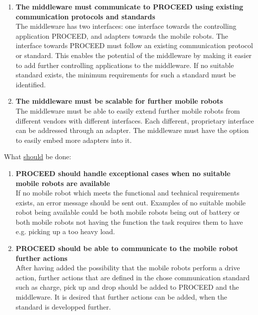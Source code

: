 \begin{enumerate}
   \item \textbf{The middleware must communicate to PROCEED using existing communication protocols and standards} \hfill \\ 
	The middleware has two interfaces: one interface towards the controlling application PROCEED, and adapters towards the mobile robots. The interface towards PROCEED must follow an existing communication protocol or standard. This enables the potential of the middleware by making it easier to add further controlling applications to the middleware. If no suitable standard exists, the minimum requirements for such a standard must be identified.
   \item \textbf{The middleware must be scalable for further mobile robots} \hfill \\ 
	The middleware must be able to easily extend further mobile robots from different vendors with different interfaces. Each different, proprietary interface can be addressed through an adapter. The middleware must have the option to easily embed more adapters into it.
\end{enumerate}

What \underline{should} be done:
\begin{enumerate}
   \item \textbf{PROCEED should handle exceptional cases when no suitable mobile robots are available} \hfill \\ 
	If no mobile robot which meets the functional and technical requirements exists, an error message should be sent out. Examples of no suitable mobile robot being available could be both mobile robots being out of battery or both mobile robots not having the function the task requires them to have e.g. picking up a too heavy load.
   \item \textbf{PROCEED should be able to communicate to the mobile robot further actions} \hfill \\ 
	After having added the possibility that the mobile robots perform a drive action, further actions that are defined in the chose communication standard such as charge, pick up and drop should be added to PROCEED and the middleware. It is desired that further actions can be added, when the standard is developped further.
\end{enumerate}

